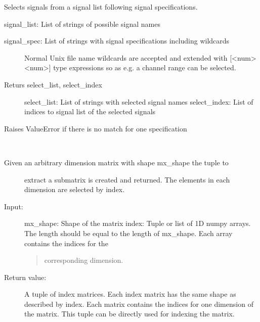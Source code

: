 \documentclass[letterpaper,10pt,english]{sphinxmanual}
\begin{document}
\begin{fulllineitems}
\label{\detokenize{tools:flap.tools.select_signals}}
Selects signals from a signal list following signal specifications.

signal\_list: List of strings of possible signal names
\begin{description}
\item[{signal\_spec: List of strings with signal specifications including wildcards}] \leavevmode
Normal Unix file name wildcards are accepted and extended with
{[}\textless{}num\textgreater{}\sphinxhyphen{}\textless{}num\textgreater{}{]} type expressions so as e.g. a channel range can be selected.

\item[{Returs select\_list, select\_index}] \leavevmode
select\_list: List of strings with selected signal names
select\_index: List of indices to signal list of the selected signals

\end{description}

Raises ValueError if there is no match for one specification

\end{fulllineitems}


\begin{fulllineitems}
\label{\detokenize{tools:flap.tools.submatrix_index}}~\begin{description}
\item[{Given an arbitrary dimension matrix with shape mx\_shape the tuple to}] \leavevmode
extract a submatrix is created and returned.
The elements in each dimension are selected by index.

\item[{Input:}] \leavevmode
mx\_shape: Shape of the matrix
index: Tuple or list of 1D numpy arrays. The length should be equal to the
length of mx\_shape. Each array contains the indices for the
\begin{quote}

corresponding dimension.
\end{quote}

\item[{Return value:}] \leavevmode
A tuple of index matrices. Each index matrix has the same shape as
described by index. Each matrix contains the indices for one dimension
of the matrix. This tuple can be directly used for indexing the matrix.

\end{description}

\end{fulllineitems}
\end{document}
